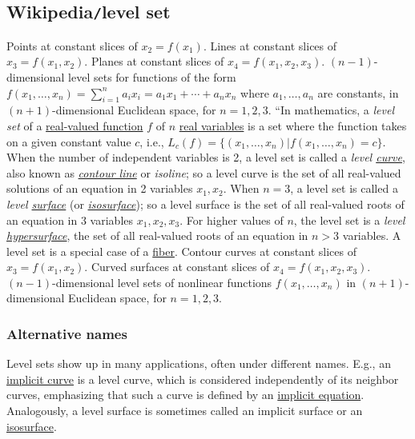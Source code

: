 \documentclass{article}
\begin{document}
\subsection{Wikipedia{\tt/}level set}
{\sf Points at constant slices of $x_2 = f(x_1)$. Lines at constant slices of $x_3 = f(x_1,x_2)$. Planes at constant slices of $x_4 = f(x_1,x_2,x_3)$. $(n - 1)$-dimensional level sets for functions of the form $f(x_1,\ldots,x_n) = \sum_{i=1}^n a_ix_i = a_1x_1 + \cdots + a_nx_n$ where $a_1,\ldots,a_n$ are constants, in $(n + 1)$-dimensional Euclidean space, for $n = 1,2,3$.} ``In mathematics, a {\it level set} of a \href{https://en.wikipedia.org/wiki/Real-valued_function}{real-valued function} $f$ of $n$ \href{https://en.wikipedia.org/wiki/Function_of_several_real_variables}{real variables} is a set where the function takes on a given constant value $c$, i.e., $L_c(f) = \{(x_1,\ldots,x_n)|f(x_1,\ldots,x_n) = c\}$. When the number of independent variables is 2, a level set is called a {\it level \href{https://en.wikipedia.org/wiki/Curve}{curve}}, also known as \href{https://en.wikipedia.org/wiki/Contour_line}{\it contour line} or {\it isoline}; so a level curve is the set of all real-valued solutions of an equation in 2 variables $x_1,x_2$. When $n = 3$, a level set is called a {\it level \href{https://en.wikipedia.org/wiki/Surface_(mathematics)}{surface}} (or \href{https://en.wikipedia.org/wiki/Isosurface}{\it isosurface}); so a level surface is the set of all real-valued roots of an equation in 3 variables $x_1,x_2,x_3$. For higher values of $n$, the level set is a {\it level \href{https://en.wikipedia.org/wiki/Hypersurface}{hypersurface}}, the set of all real-valued roots of an equation in $n > 3$ variables. A level set is a special case of a \href{https://en.wikipedia.org/wiki/Fiber_(mathematics)}{fiber}. {\sf Contour curves at constant slices of $x_3 = f(x_1,x_2)$. Curved surfaces at constant slices of $x_4 = f(x_1,x_2,x_3)$. $(n - 1)$-dimensional level sets of nonlinear functions $f(x_1,\ldots,x_n)$ in $(n + 1)$-dimensional Euclidean space, for $n = 1,2,3$.}

\subsubsection{Alternative names}
Level sets show up in many applications, often under different names. E.g., an \href{https://en.wikipedia.org/wiki/Implicit_curve}{implicit curve} is a level curve, which is considered independently of its neighbor curves, emphasizing that such a curve is defined by an \href{https://en.wikipedia.org/wiki/Implicit_equation}{implicit equation}. Analogously, a level surface is sometimes called an implicit surface or an \href{https://en.wikipedia.org/wiki/Isosurface}{isosurface}.
\end{document}
